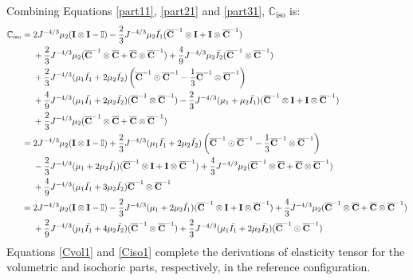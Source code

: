Combining Equations \ref{part11}, \ref{part21} and \ref{part31}, $\mathbb{C}_\mathrm{iso}$ is:
\begin{equation} \label{Ciso1}
\begin{split}
\mathbb{C}_\mathrm{iso} 
= {} & 
2{J}^{-4/3}\mu_2(\bold{I} \otimes \bold{I} - \mathbb{I}) - \frac{2}{3}J^{-4/3}\mu_2\bar{I_1}({\overline{\bold{C}}}^{-1} \otimes \bold{I} + \bold{I} \otimes {\overline{\bold{C}}}^{-1}) \\
&+
\frac{2}{3}J^{-4/3}\mu_2({\overline{\bold{C}}}^{-1} \otimes {\overline{\bold{C}}} + {\overline{\bold{C}}} \otimes {\overline{\bold{C}}}^{-1}) + \frac{4}{9}J^{-4/3}\mu_2\bar{I_2}({\overline{\bold{C}}}^{-1} \otimes {\overline{\bold{C}}}^{-1}) \\
&+
\frac{2}{3}J^{-4/3}(\mu_1\bar{I_1} + 2\mu_2\bar{I_2}) \left ({\overline{\bold{C}}}^{-1} \odot {{\overline{\bold{C}}}}^{-1} - \frac{1}{3}{{\overline{\bold{C}}}}^{-1} \otimes {\overline{{\bold{C}}}}^{-1} \right) \\
&+
\frac{4}{9}J^{-4/3} (\mu_1\bar{I_1} + 2\mu_2\bar{I_2})({\overline{\bold{C}}}^{-1} \otimes {\overline{\bold{C}}}^{-1}) - \frac{2}{3}J^{-4/3}(\mu_1+\mu_2\bar{I_1})({\overline{\bold{C}}}^{-1} \otimes \bold{I} + \bold{I} \otimes {\overline{\bold{C}}}^{-1})\\
&+ \frac{2}{3}J^{-4/3}\mu_2({\overline{\bold{C}}}^{-1} \otimes {\overline{\bold{C}}}+{\overline{\bold{C}}} \otimes {\overline{\bold{C}}}^{-1})  \\
= {} &
2{J}^{-4/3}\mu_2(\bold{I} \otimes \bold{I} - \mathbb{I}) + \frac{2}{3}J^{-4/3}(\mu_1\bar{I_1} + 2\mu_2\bar{I_2})\left({\overline{\bold{C}}}^{-1} \odot {\overline{\bold{C}}}^{-1} - \frac{1}{3}{\overline{\bold{C}}}^{-1} \otimes {\overline{\bold{C}}}^{-1}\right) \\
&-
\frac{2}{3}J^{-4/3}(\mu_1 + 2\mu_2\bar{I_1})({\overline{\bold{C}}}^{-1} \otimes \bold{I} + \bold{I} \otimes {\overline{\bold{C}}}^{-1}) + \frac{4}{3}J^{-4/3}\mu_2({\overline{\bold{C}}}^{-1} \otimes {\overline{\bold{C}}} + {\overline{\bold{C}}} \otimes {\overline{\bold{C}}}^{-1}) \\
&+
\frac{4}{9}J^{-4/3}(\mu_1\bar{I_1} + 3\mu_2\bar{I_2}){\overline{\bold{C}}}^{-1} \otimes {\overline{\bold{C}}}^{-1} \\
= {} &
2{J}^{-4/3}\mu_2(\bold{I} \otimes \bold{I} - \mathbb{I}) - \frac{2}{3}J^{-4/3}(\mu_1 + 2\mu_2\bar{I_1})({\overline{\bold{C}}}^{-1} \otimes \bold{I} + \bold{I} \otimes {\overline{\bold{C}}}^{-1}) + \frac{4}{3}J^{-4/3}\mu_2({\overline{\bold{C}}}^{-1} \otimes {\overline{\bold{C}}} + {\overline{\bold{C}}} \otimes {\overline{\bold{C}}}^{-1}) \\
&+
\frac{2}{9}J^{-4/3}(\mu_1\bar{I_1} + 4\mu_2\bar{I_2}) ({\overline{\bold{C}}}^{-1} \otimes {\overline{\bold{C}}}^{-1}) + \frac{2}{3}J^{-4/3}(\mu_1\bar{I_1} + 2\mu_2\bar{I_2})({\overline{\bold{C}}}^{-1} \odot {\overline{\bold{C}}}^{-1}) 
\end{split}
\end{equation} 
Equations \ref{Cvol1} and \ref{Ciso1} complete the derivations of elasticity tensor for the volumetric and isochoric parts, respectively, in the reference configuration.

